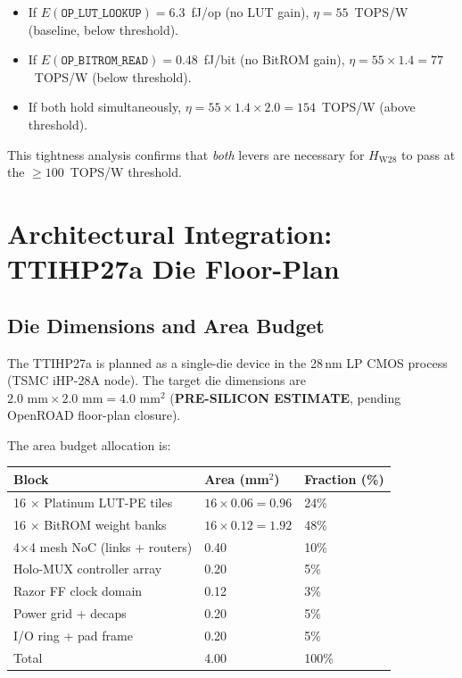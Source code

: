\begin{itemize}
  \item If \(E(\mathtt{OP\_LUT\_LOOKUP}) = 6.3\)~fJ/op (no LUT gain),
    \(\eta = 55\)~TOPS/W (baseline, below threshold).
  \item If \(E(\mathtt{OP\_BITROM\_READ}) = 0.48\)~fJ/bit (no BitROM gain),
    \(\eta = 55 \times 1.4 = 77\)~TOPS/W (below threshold).
  \item If both hold simultaneously, \(\eta = 55 \times 1.4 \times 2.0 = 154\)~TOPS/W
    (above threshold).
\end{itemize}

This tightness analysis confirms that \emph{both} levers are necessary for
\(H_{\mathrm{W28}}\) to pass at the \(\geq 100\)~TOPS/W threshold.

\section{Architectural Integration: TTIHP27a Die Floor-Plan}
\label{sec:floorplan}

\subsection{Die Dimensions and Area Budget}

The TTIHP27a is planned as a single-die device in the 28\,nm LP CMOS
process (TSMC iHP-28A node).  The target die dimensions are
\(2.0\text{ mm} \times 2.0\text{ mm} = 4.0\text{ mm}^{2}\)
(\textbf{PRE-SILICON ESTIMATE}, pending OpenROAD floor-plan closure).

The area budget allocation is:

\begin{center}
\begin{tabular}{lll}
\toprule
Block & Area (mm\(^{2}\)) & Fraction (\%) \\
\midrule
16 × Platinum LUT-PE tiles    & \(16 \times 0.06 = 0.96\) & 24\% \\
16 × BitROM weight banks      & \(16 \times 0.12 = 1.92\) & 48\% \\
4×4 mesh NoC (links + routers)& 0.40 & 10\% \\
Holo-MUX controller array     & 0.20 & 5\% \\
Razor FF clock domain         & 0.12 & 3\% \\
Power grid + decaps           & 0.20 & 5\% \\
I/O ring + pad frame          & 0.20 & 5\% \\
\midrule
Total                         & 4.00 & 100\% \\
\bottomrule
\end{tabular}
\end{center}

